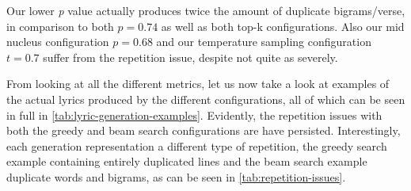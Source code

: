 Our lower \textit{p} value actually produces twice the amount of duplicate bigrams/verse, in comparison to both $p=0.74$ as well as both top-k configurations. Also our mid nucleus configuration $p=0.68$ and our temperature sampling configuration $t=0.7$ suffer from the repetition issue, despite not quite as severely.

From looking at all the different metrics, let us now take a look at examples of the actual lyrics produced by the different configurations, all of which can be seen in full in \cref{tab:lyric-generation-examples}. Evidently, the repetition issues with both the greedy and beam search configurations are have persisted. Interestingly, each generation representation a different type of repetition, the greedy search example containing entirely duplicated lines and the beam search example duplicate words and bigrams, as can be seen in \cref{tab:repetition-issues}.

\begin{table}[H]
    \begin{center}
    \caption{Types of Repetiton Issues with Greedy Search and Beam Search}
    \vspace{5pt}
    \bgroup
    \renewcommand\cellset{\renewcommand\arraystretch{1.13}}
    \def\arraystretch{1.8}
    \label{tab:repetition-issues}
    \egroup
    \end{center}
\end{table}


